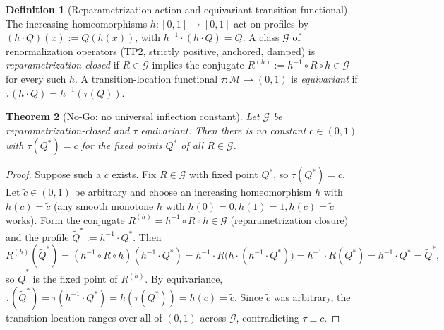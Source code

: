 \documentclass[11pt]{article}
\theoremstyle{plain}
\newtheorem{theorem}{Theorem}[section]
\theoremstyle{definition}
\newtheorem{definition}[theorem]{Definition}
\theoremstyle{remark}
\begin{document}
\begin{definition}[Reparametrization action and equivariant transition functional]\label{def:reparam}
The increasing homeomorphisms $h:[0,1]\to[0,1]$ act on profiles by $(h\cdot Q)(x):=Q(h(x))$, with $h^{-1}\cdot(h\cdot Q)=Q$. A class $\mathcal G$ of renormalization operators (TP2, strictly positive, anchored, damped) is \emph{reparametrization-closed} if $R\in\mathcal G$ implies the conjugate $R^{(h)}:=h^{-1}\circ R\circ h\in\mathcal G$ for every such $h$. A transition-location functional $\tau:\mathcal M\to(0,1)$ is \emph{equivariant} if $\tau(h\cdot Q)=h^{-1}(\tau(Q))$.
\end{definition}

\begin{theorem}[No-Go: no universal inflection constant]\label{thm:nogo}
Let $\mathcal G$ be reparametrization-closed and $\tau$ equivariant. Then there is no constant $c\in(0,1)$ with $\tau(Q^*)=c$ for the fixed points $Q^*$ of all $R\in\mathcal G$.
\end{theorem}
\begin{proof}
Suppose such a $c$ exists. Fix $R\in\mathcal G$ with fixed point $Q^*$, so $\tau(Q^*)=c$. Let $\tilde c\in(0,1)$ be arbitrary and choose an increasing homeomorphism $h$ with $h(c)=\tilde c$ (any smooth monotone $h$ with $h(0)=0,h(1)=1,h(c)=\tilde c$ works). Form the conjugate $R^{(h)}=h^{-1}\circ R\circ h\in\mathcal G$ (reparametrization closure) and the profile $\tilde Q^*:=h^{-1}\cdot Q^*$. Then
\[
R^{(h)}(\tilde Q^*)=(h^{-1}\circ R\circ h)(h^{-1}\cdot Q^*)=h^{-1}\cdot R\big(h\cdot(h^{-1}\cdot Q^*)\big)=h^{-1}\cdot R(Q^*)=h^{-1}\cdot Q^*=\tilde Q^*,
\]
so $\tilde Q^*$ is the fixed point of $R^{(h)}$. By equivariance, $\tau(\tilde Q^*)=\tau(h^{-1}\cdot Q^*)=h(\tau(Q^*))=h(c)=\tilde c$. Since $\tilde c$ was arbitrary, the transition location ranges over all of $(0,1)$ across $\mathcal G$, contradicting $\tau\equiv c$.
\end{proof}
\end{document}
